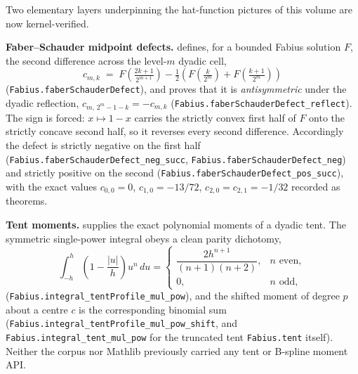 \documentclass[11pt]{article}
\theoremstyle{definition}
\theoremstyle{remark}
\begin{document}
Two elementary layers underpinning the hat-function pictures of this volume are now
kernel-verified.

\smallskip
\textbf{Faber--Schauder midpoint defects.}   defines, for a
bounded Fabius solution $F$, the second difference across the level-$m$ dyadic cell,
\[
  c_{m,k}\;=\;F\!\left(\tfrac{2k+1}{2^{m+1}}\right)-\tfrac12\left(F\!\left(\tfrac{k}{2^m}\right)+F\!\left(\tfrac{k+1}{2^m}\right)\right)
\]
(\nolinkurl{Fabius.faberSchauderDefect}), and proves that it is \emph{antisymmetric}
under the dyadic reflection,
$c_{m,\,2^m-1-k}=-c_{m,k}$
(\nolinkurl{Fabius.faberSchauderDefect\_reflect}).  The sign is forced: $x\mapsto1-x$
carries the strictly convex first half of $F$ onto the strictly concave second half, so
it reverses every second difference.  Accordingly the defect is strictly negative on the
first half
(\nolinkurl{Fabius.faberSchauderDefect\_neg\_succ}, \nolinkurl{Fabius.faberSchauderDefect\_neg})
and strictly positive on the second
(\nolinkurl{Fabius.faberSchauderDefect\_pos\_succ}), with the exact values
$c_{0,0}=0$, $c_{1,0}=-13/72$, $c_{2,0}=c_{2,1}=-1/32$ recorded as theorems.

\smallskip
\textbf{Tent moments.}   supplies the exact polynomial moments of
a dyadic tent.  The symmetric single-power integral obeys a clean parity dichotomy,
\[
  \int_{-h}^{h}\left(1-\frac{|u|}{h}\right)u^{n}\,du
  =\begin{cases}
     \dfrac{2h^{n+1}}{(n+1)(n+2)}, & n \text{ even},\\[2mm]
     0, & n \text{ odd},
   \end{cases}
\]
(\nolinkurl{Fabius.integral\_tentProfile\_mul\_pow}), and the shifted moment of degree $p$
about a centre $c$ is the corresponding binomial sum
(\nolinkurl{Fabius.integral\_tentProfile\_mul\_pow\_shift}, and
\nolinkurl{Fabius.integral\_tent\_mul\_pow} for the truncated tent \nolinkurl{Fabius.tent}
itself).  Neither the corpus nor Mathlib previously carried any tent or B-spline
moment API.
\end{document}
